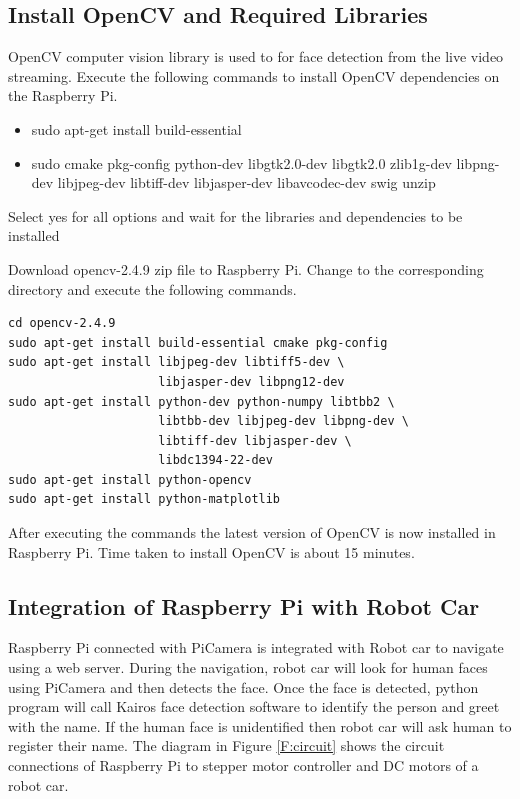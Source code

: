 \documentclass[sigconf]{acmart}
\begin{document}
\subsection{Install OpenCV and Required Libraries}
OpenCV computer vision library is used to for face detection from the live video streaming. 
Execute the following commands to install OpenCV dependencies on the Raspberry Pi.

\begin{itemize}
\item sudo apt-get install build-essential
\item sudo cmake pkg-config python-dev libgtk2.0-dev libgtk2.0 zlib1g-dev libpng-dev 
libjpeg-dev libtiff-dev libjasper-dev libavcodec-dev swig unzip
\end{itemize}
Select yes for all options and wait for the libraries and dependencies to be installed


Download opencv-2.4.9 zip file to Raspberry Pi. Change to the corresponding directory 
and execute the following commands.

\begin{verbatim}
cd opencv-2.4.9
sudo apt-get install build-essential cmake pkg-config
sudo apt-get install libjpeg-dev libtiff5-dev \
                     libjasper-dev libpng12-dev
sudo apt-get install python-dev python-numpy libtbb2 \ 
                     libtbb-dev libjpeg-dev libpng-dev \ 
                     libtiff-dev libjasper-dev \ 
                     libdc1394-22-dev
sudo apt-get install python-opencv
sudo apt-get install python-matplotlib

\end{verbatim}

After executing the commands the latest version of OpenCV is now installed in Raspberry Pi. 
Time taken to install OpenCV is about 15 minutes.

\subsection{Integration of Raspberry Pi with Robot Car}
Raspberry Pi connected with PiCamera is integrated with Robot car to navigate using a web server. 
During the navigation, robot car will look for human faces using PiCamera and then detects 
the face. Once the face is detected, python program will call Kairos face detection software 
to identify the person and greet with the name. If the human face is unidentified then robot 
car will ask human to register their name.
The diagram in Figure \ref{F:circuit} shows the circuit connections of Raspberry Pi to stepper 
motor controller and DC motors of a robot car.
\end{document}
